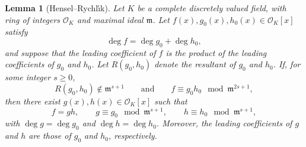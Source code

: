 \documentclass[11pt,a4paper]{article}
\theoremstyle{definition}
\theoremstyle{plain}
\newtheorem{Le}[shared]{Lemma}
\theoremstyle{remark}
\theoremstyle{plain}
\begin{document}
\begin{Le}[Hensel--Rychl\'{\i}k]\label{henselrychlik}
    Let $K$ be a complete discretely valued field, with ring of integers $\mathcal{O}_K$ and maximal ideal $\mathfrak{m}$. Let $f(x),g_0(x),h_0(x)\in\mathcal{O}_K[x]$ satisfy
    $$\deg f=\deg g_0+\deg h_0,$$
    and suppose that the leading coefficient of $f$ is the product of the leading coefficients of $g_0$ and $h_0$. Let $R(g_0,h_0)$ denote the resultant of $g_0$ and $h_0$. If, for some integer $s\geq 0$,
    $$R(g_0,h_0)\notin\mathfrak{m}^{s+1}\qquad\text{and}\qquad f\equiv g_0h_0\mod \mathfrak{m}^{2s+1},$$
    then there exist $g(x),h(x)\in\mathcal{O}_K[x]$ such that
    $$f=gh,\qquad g\equiv g_0\mod\mathfrak{m}^{s+1},\qquad h\equiv h_0\mod\mathfrak{m}^{s+1},$$
    with $\deg g=\deg g_0$ and $\deg h=\deg h_0$. Moreover, the leading coefficients of $g$ and $h$ are those of $g_0$ and $h_0$, respectively.
\end{Le}
\end{document}
